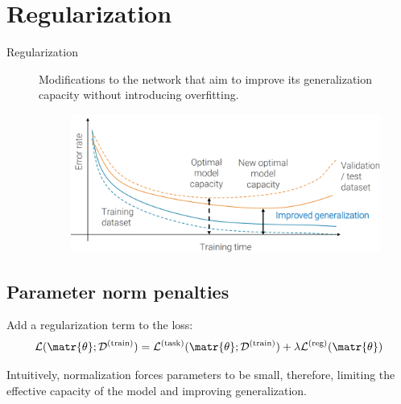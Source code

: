 \section{Regularization}

\begin{description}
    \item[Regularization]  
        Modifications to the network that aim to improve its generalization capacity without introducing overfitting.
        \begin{figure}[H]
            \centering
            \includegraphics[width=0.5\linewidth]{./img/regularization.png}
        \end{figure}
\end{description}


\subsection{Parameter norm penalties}

Add a regularization term to the loss:
\[ 
    \mathcal{L}(\matr{\theta}; \mathcal{D}^\text{(train)}) = 
        \mathcal{L}^\text{(task)}(\matr{\theta}; \mathcal{D}^\text{(train)}) + 
        \lambda \mathcal{L}^\text{(reg)}(\matr{\theta}) 
\]

\begin{remark}
    Intuitively, normalization forces parameters to be small, therefore, limiting the effective capacity of the model and improving generalization.
\end{remark}

